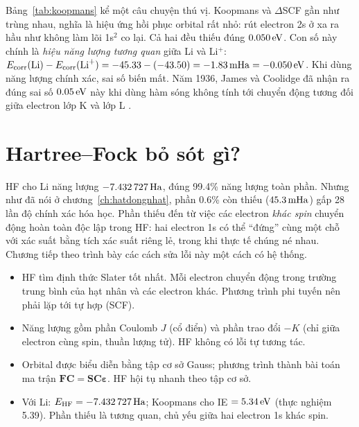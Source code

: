 Bảng~\ref{tab:koopmans} kể một câu chuyện thú vị. Koopmans và $\Delta$SCF gần như trùng nhau, nghĩa là hiệu ứng hồi phục orbital rất nhỏ: rút electron 2s ở xa ra hầu như không làm lõi 1s$^2$ co lại. Cả hai đều thiếu đúng $0.050\,\mathrm{eV}$. Con số này chính là \emph{hiệu năng lượng tương quan} giữa Li và Li$^+$: $E_{\mathrm{corr}}(\text{Li})-E_{\mathrm{corr}}(\text{Li}^+)=-45.33-(-43.50)=-1.83\,\mathrm{mHa}=-0.050\,\mathrm{eV}$. Khi dùng năng lượng chính xác, sai số biến mất. Năm 1936, James và Coolidge đã nhận ra đúng sai số $0.05\,\mathrm{eV}$ này khi dùng hàm sóng không tính tới chuyển động tương đối giữa electron lớp K và lớp L \cite{JamesCoolidge1936}.

\section{Hartree--Fock bỏ sót gì?}
HF cho Li năng lượng $-7.432\,727\,\mathrm{Ha}$, đúng 99.4\% năng lượng toàn phần. Nhưng như đã nói ở chương~\ref{ch:hatdongnhat}, phần 0.6\% còn thiếu ($45.3\,\mathrm{mHa}$) gấp 28 lần độ chính xác hóa học. Phần thiếu đến từ việc các electron \emph{khác spin} chuyển động hoàn toàn độc lập trong HF: hai electron 1s có thể ``đứng'' cùng một chỗ với xác suất bằng tích xác suất riêng lẻ, trong khi thực tế chúng né nhau. Chương tiếp theo trình bày các cách sửa lỗi này một cách có hệ thống.

\begin{ghinho}
\begin{itemize}
\item HF tìm định thức Slater tốt nhất. Mỗi electron chuyển động trong trường trung bình của hạt nhân và các electron khác. Phương trình phi tuyến nên phải lặp tới tự hợp (SCF).
\item Năng lượng gồm phần Coulomb $J$ (cổ điển) và phần trao đổi $-K$ (chỉ giữa electron cùng spin, thuần lượng tử). HF không có lỗi tự tương tác.
\item Orbital được biểu diễn bằng tập cơ sở Gauss; phương trình thành bài toán ma trận $\mathbf{FC}=\mathbf{SC}\boldsymbol\varepsilon$. HF hội tụ nhanh theo tập cơ sở.
\item Với Li: $E_{\mathrm{HF}}=-7.432\,727\,\mathrm{Ha}$; Koopmans cho IE $=5.34\,\mathrm{eV}$ (thực nghiệm 5.39). Phần thiếu là tương quan, chủ yếu giữa hai electron 1s khác spin.
\end{itemize}
\end{ghinho}
